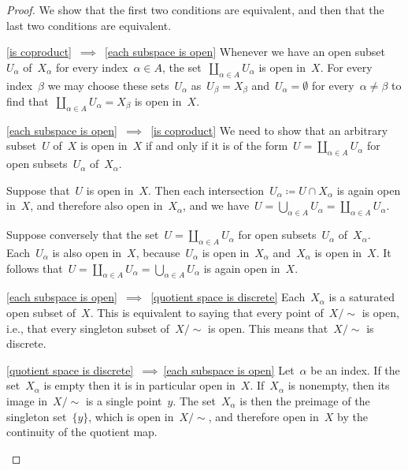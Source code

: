 \begin{proof}
	We show that the first two conditions are equivalent, and then that the last two conditions are equivalent.
	\begin{implicationslist}

	\item[\ref{is coproduct}~$\implies$~\ref{each subspace is open}]
		Whenever we have an open subset~$U_α$ of~$X_α$ for every index~$α ∈ A$, the set~$∐_{α ∈ A} U_α$ is open in~$X$.
		For every index~$β$ we may choose these sets~$U_α$ as~$U_β = X_β$ and~$U_α = ∅$ for every~$α ≠ β$ to find that~$∐_{α ∈ A} U_α = X_β$ is open in~$X$.

	\item[\ref{each subspace is open}~$\implies$~\ref{is coproduct}]
		We need to show that an arbitrary subset~$U$ of~$X$ is open in~$X$ if and only if it is of the form~$U = ∐_{α ∈ A} U_α$ for open subsets~$U_α$ of~$X_α$.

		Suppose that~$U$ is open in~$X$.
		Then each intersection~$U_α ≔ U ∩ X_α$ is again open in~$X$, and therefore also open in~$X_α$, and we have~$U = ⋃_{α ∈ A} U_α = ∐_{α ∈ A} U_α$.

		Suppose conversely that the set~$U = ∐_{α ∈ A} U_α$ for open subsets~$U_α$ of~$X_α$.
		Each~$U_α$ is also open in~$X$, because~$U_α$ is open in~$X_α$ and~$X_α$ is open in~$X$.
		It follows that~$U = ∐_{α ∈ A} U_α = ⋃_{α ∈ A} U_α$ is again open in~$X$.

	\item[\ref{each subspace is open}~$\implies$~\ref{quotient space is discrete}]
		Each~$X_α$ is a saturated open subset of~$X$.
		This is equivalent to saying that every point of~$X / {∼}$ is open, i.e., that every singleton subset of~$X / {∼}$ is open.
		This means that~$X / {∼}$ is discrete.

	\item[\ref{quotient space is discrete}~$\implies~$\ref{each subspace is open}]
		Let~$α$ be an index.
		If the set~$X_α$ is empty then it is in particular open in~$X$.
		If~$X_α$ is nonempty, then its image in~$X / {∼}$ is a single point~$y$.
		The set~$X_α$ is then the preimage of the singleton set~$\{ y \}$, which is open in~$X / {∼}$, and therefore open in~$X$ by the continuity of the quotient map.
	\qedhere

	\end{implicationslist}
\end{proof}
